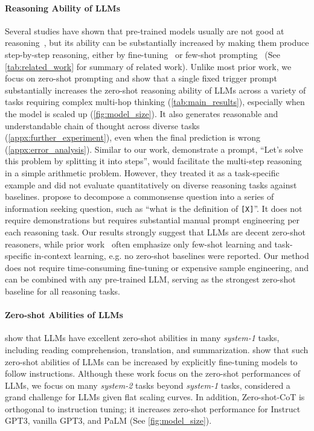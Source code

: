 \documentclass{article}
\newcommand{\CoT}{chain of thought\xspace}
\newcommand{\ours}{Zero-shot-CoT\xspace}
\begin{document}
\paragraph{Reasoning Ability of LLMs} 
Several studies have shown that pre-trained models usually are not good at reasoning~\citep{brown2020language,megatron,gopher}, but its ability can be substantially increased by making them produce step-by-step reasoning, either by fine-tuning~\citep{yourself,gsm8k,star,scratchpad} or few-shot prompting~\citep{cot_wei,cot_wei_sc,palm} (See \autoref{tab:related_work} for summary of related work).
Unlike most prior work, we focus on zero-shot prompting and
show that a single fixed trigger prompt substantially increases the zero-shot reasoning ability of LLMs across a variety of tasks requiring complex multi-hop thinking (\autoref{tab:main_results}), especially when the model is scaled up (\autoref{fig:model_size}). 
It also generates reasonable and understandable \CoT across diverse tasks (\autoref{appx:further_experiment}), even when the final prediction is wrong (\autoref{appx:error_analysis}). 
Similar to our work, \citet{prompt1} demonstrate a prompt, ``Let's solve this problem by splitting it into steps'', would facilitate the multi-step reasoning in a simple arithmetic problem. However, they treated it as a task-specific example and did not evaluate quantitatively on diverse reasoning tasks against baselines. 
\citet{selftalk} propose to decompose a commonsense question into a series of information seeking question, such as ``what is the definition of \texttt{[X]}''. It does not require demonstrations but requires substantial manual prompt engineering per each reasoning task. 
Our results strongly suggest that LLMs are decent zero-shot reasoners, while prior work~\citep{cot_wei} often emphasize only few-shot learning and task-specific in-context learning, e.g. no zero-shot baselines were reported. 
Our method does not require time-consuming fine-tuning or expensive sample engineering, and can be combined with any pre-trained LLM, serving as the strongest zero-shot baseline for all reasoning tasks. 

\paragraph{Zero-shot Abilities of LLMs}  \citet{Radford2019LanguageMA} show that LLMs have excellent zero-shot abilities in many \textit{system-1} tasks, including reading comprehension, translation, and summarization. 
\citet{sanh2022multitask,instructgpt} show that such zero-shot abilities of LLMs can be increased by explicitly fine-tuning models to follow instructions. 
Although these work focus on the zero-shot performances of LLMs, we focus on many \textit{system-2} tasks beyond \textit{system-1} tasks, considered a grand challenge for LLMs given flat scaling curves. 
In addition, \ours is orthogonal to instruction tuning; it increases zero-shot performance for Instruct GPT3, vanilla GPT3, and PaLM (See \autoref{fig:model_size}). 
\end{document}
